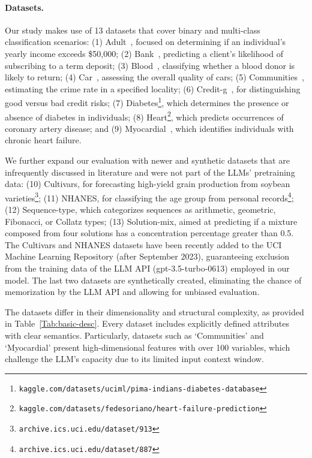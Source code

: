 \paragraph{Datasets.}
Our study makes use of 13 datasets that cover binary and multi-class classification scenarios: (1) Adult~\cite{asuncion2007uci}, focused on determining if an individual’s yearly income exceeds \$50,000; (2) Bank~\cite{moro2014data}, predicting a client’s likelihood of subscribing to a term deposit; (3) Blood~\cite{yeh2009knowledge}, classifying whether a blood donor is likely to return; (4) Car~\cite{kadra2021well}, assessing the overall quality of cars; (5) Communities~\cite{misc_communities_and_crime_183}, estimating the crime rate in a specified locality; (6) Credit-g~\cite{kadra2021well}, for distinguishing good versus bad credit risks; (7) Diabetes\footnote{\texttt{kaggle.com/datasets/uciml/pima-indians-diabetes-database}}, which determines the presence or absence of diabetes in individuals; (8) Heart\footnote{\texttt{kaggle.com/datasets/fedesoriano/heart-failure-prediction}}, which predicts occurrences of coronary artery disease; and (9) Myocardial~\cite{misc_myocardial_infarction_complications_579}, which identifies individuals with chronic heart failure.

We further expand our evaluation with newer and synthetic datasets that are infrequently discussed in literature and were not part of the LLMs’ pretraining data: (10) Cultivars, for forecasting high-yield grain production from soybean varieties\footnote{\texttt{archive.ics.uci.edu/dataset/913}}; (11) NHANES, for classifying the age group from personal records\footnote{\texttt{archive.ics.uci.edu/dataset/887}}; (12) Sequence-type, which categorizes sequences as arithmetic, geometric, Fibonacci, or Collatz types; (13) Solution-mix, aimed at predicting if a mixture composed from four solutions has a concentration percentage greater than 0.5. The Cultivars and NHANES datasets have been recently added to the UCI Machine Learning Repository (after September 2023), guaranteeing exclusion from the training data of the LLM API (gpt-3.5-turbo-0613) employed in our model. The last two datasets are synthetically created, eliminating the chance of memorization by the LLM API and allowing for unbiased evaluation.

The datasets differ in their dimensionality and structural complexity, as provided in Table~\ref{Tab:basic-desc}. Every dataset includes explicitly defined attributes with clear semantics. Particularly, datasets such as `Communities' and `Myocardial' present high-dimensional features with over 100 variables, which challenge the LLM's capacity due to its limited input context window.

